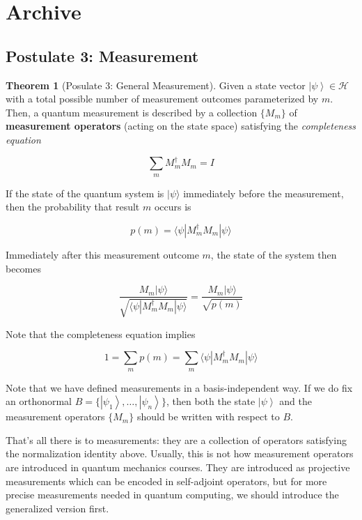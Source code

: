 \documentclass{article}
\newcommand{\ket}[1]{\ensuremath{\left|#1\right\rangle}}
\theoremstyle{definition}
\newtheorem{theorem}{Theorem}[section]
\begin{document}
\section{Archive}

  \subsection{Postulate 3: Measurement}

    \begin{theorem}[Posulate 3: General Measurement]
      Given a state vector $\ket{\psi} \in \mathcal{H}$ with a total possible number of measurement outcomes parameterized by $m$. Then, a quantum measurement is described by a collection $\{M_m\}$ of \textbf{measurement operators} (acting on the state space) satisfying the \textit{completeness equation}

        \[\sum_{m} M_m^\dagger M_m = I\]

      If the state of the quantum system is $|\psi \rangle$ immediately before the measurement, then the probability that result $m$ occurs is

        \[p(m) = \langle \psi | M_m^\dagger M_m | \psi \rangle\]

      Immediately after this measurement outcome $m$, the state of the system then becomes

        \[\frac{M_m |\psi \rangle}{\sqrt{\langle \psi| M_m^\dagger M_m |\psi \rangle}} = \frac{M_m |\psi \rangle}{\sqrt{p(m)}}\]

      Note that the completeness equation implies

        \[1 = \sum_m p(m) = \sum_m \langle \psi | M_m^\dagger M_m | \psi \rangle\]

      Note that we have defined measurements in a basis-independent way. If we do fix an orthonormal $B = \{ \ket{\psi_1}, \ldots, \ket{\psi_n}\}$, then both the state $\ket{\psi}$ and the measurement operators $\{M_m\}$ should be written with respect to $B$. 
    \end{theorem}

    That's all there is to measurements: they are a collection of operators satisfying the normalization identity above. Usually, this is not how measurement operators are introduced in quantum mechanics courses. They are introduced as projective measurements which can be encoded in self-adjoint operators, but for more precise measurements needed in quantum computing, we should introduce the generalized version first. 
\end{document}
